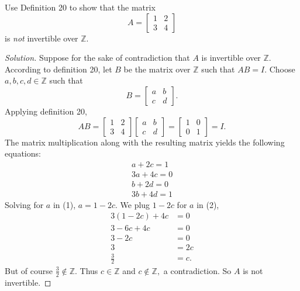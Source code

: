 \documentclass[12pt]{article}
\newcommand{\Z}{\mathbb{Z}}
\newenvironment{exercise}[2][Exercise]{\begin{trivlist}
        \item[\hskip \labelsep {\bfseries #1}\hskip \labelsep {\bfseries #2.}]}{\end{trivlist}}
\newenvironment{solution}
        {\begin{proof}[Solution]}
                    {\end{proof}}
\begin{document}
\begin{exercise}{31}
    Use Definition 20 to show that the matrix $$ A = \begin{bmatrix}
        1 & 2\\
        3 & 4
    \end{bmatrix}$$ is \textit{not} invertible over \( \Z. \)
    \begin{solution}
        Suppose for the sake of contradiction that \( A \) is invertible over \( \Z. \) According to definition 20, let \( B \) be the matrix over \( \Z \) such that \( AB = I. \) Choose \( a,b,c,d \in \Z \) such that $$ B = \begin{bmatrix}
            a & b\\
            c & d
        \end{bmatrix} .$$
        Applying definition 20,
        $$ AB = \begin{bmatrix}
            1 & 2\\
            3 & 4
        \end{bmatrix} \begin{bmatrix}
            a & b\\
            c & d
        \end{bmatrix} = \begin{bmatrix}
            1 & 0\\
            0 & 1
        \end{bmatrix} = I .$$
        The matrix multiplication along with the resulting matrix yields the following equations:
        \begin{align}
            a + 2c = 1\\
            3a + 4c = 0\\
            b + 2d = 0\\
            3b + 4d = 1
        \end{align}
        Solving for \( a \) in (1), \( a = 1-2c. \) We plug \( 1-2c \) for \( a \) in (2), \begin{align*}
            3 ( 1-2c ) + 4c &=0\\
            3 - 6c + 4c &= 0\\
            3 - 2c &= 0\\
            3 &= 2c\\
            \frac{3}{2} &= c.
        \end{align*}
        But of course \( \frac{3}{2} \notin \Z. \) Thus \( c \in \Z \) and \( c \notin \Z, \) a contradiction. So \( A \) is not invertible.
    \end{solution}
\end{exercise}
\end{document}
